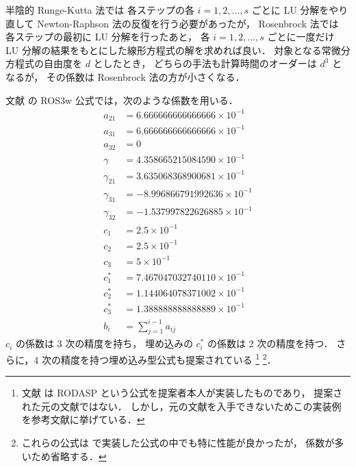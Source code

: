 半陰的 Runge-Kutta 法では
各ステップの各 $i = 1, 2, \ldots, s$ ごとに LU 分解をやり直して
Newton-Raphson 法の反復を行う必要があったが，
Rosenbrock 法では
各ステップの最初に LU 分解を行ったあと，
各 $i = 1, 2, \ldots, s$ ごとに一度だけ LU 分解の結果をもとにした線形方程式の解を求めれば良い．
対象となる常微分方程式の自由度を $d$ としたとき，
どちらの手法も計算時間のオーダーは $d^3$ となるが，
その係数は Rosenbrock 法の方が小さくなる．

文献 \cite{Rang2005} の ROS3w 公式では，次のような係数を用いる．
\begin{align}
    a_{21}      & = 6.666666666666666 \times 10^{-1}  \\
    a_{31}      & = 6.666666666666666 \times 10^{-1}  \\
    a_{32}      & = 0                                 \\
    \gamma      & = 4.358665215084590 \times 10^{-1}  \\
    \gamma_{21} & = 3.635068368900681 \times 10^{-1}  \\
    \gamma_{31} & = -8.996866791992636 \times 10^{-1} \\
    \gamma_{32} & = -1.537997822626885 \times 10^{-1} \\
    c_1         & = 2.5 \times 10^{-1}                \\
    c_2         & = 2.5 \times 10^{-1}                \\
    c_3         & = 5 \times 10^{-1}                  \\
    c_1^*       & = 7.467047032740110 \times 10^{-1}  \\
    c_2^*       & = 1.144064078371002 \times 10^{-1}  \\
    c_3^*       & = 1.388888888888889 \times 10^{-1}  \\
    b_i         & = \sum_{j = 1}^{i - 1} a_{ij}
\end{align}
$c_i$ の係数は 3 次の精度を持ち，
埋め込みの $c_i^*$ の係数は 2 次の精度を持つ．
さらに，4 次の精度を持つ埋め込み型公式も提案されている
\cite{Steinebach2022,Rang2015}
\footnote{文献 \cite{Steinebach2022} は RODASP という公式を提案者本人が実装したものであり，%
    提案された元の文献ではない．%
    しかし，元の文献を入手できないためこの実装例を参考文献に挙げている．}
\footnote{これらの公式は%
    \cite{NumericalCollectionCpp} で実装した公式の中でも特に性能が良かったが，%
    係数が多いため省略する．}．

